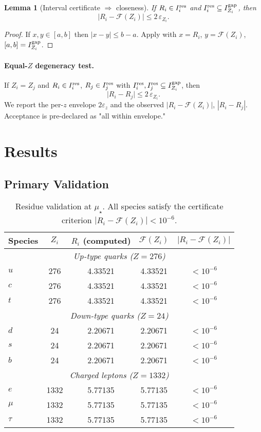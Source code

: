 \documentclass[11pt]{article}
\newtheorem{lemma}{Lemma}
\begin{document}
\begin{lemma}[Interval certificate $\Rightarrow$ closeness]
\label{lem:cert}
If $R_i \in I^{\rm res}_i$ and $I^{\rm res}_i \subseteq I^{\rm gap}_{Z_i}$, then
\[
\bigl|R_i - \mathcal{F}(Z_i)\bigr| \le 2\,\varepsilon_{Z_i}.
\]
\end{lemma}

\begin{proof}
If $x,y\in [a,b]$ then $|x-y|\le b-a$. Apply with $x=R_i$, $y=\mathcal{F}(Z_i)$, $[a,b]=I^{\rm gap}_{Z_i}$.
\end{proof}

\paragraph{Equal-$Z$ degeneracy test.}
If $Z_i=Z_j$ and $R_i\in I^{\rm res}_i$, $R_j\in I^{\rm res}_j$ with $I^{\rm res}_{i},I^{\rm res}_{j}\subseteq I^{\rm gap}_{Z_i}$, then
\[
\bigl|R_i - R_j\bigr| \le 2\,\varepsilon_{Z_i}.
\]
We report the per-$z$ envelope $2\varepsilon_z$ and the observed $|R_i-\mathcal{F}(Z_i)|$, $|R_i-R_j|$.
Acceptance is pre-declared as "all within envelope."

\section{Results}

\subsection{Primary Validation}

\begin{table}[h]
\centering
\begin{tabular}{lcccc}
\toprule
Species & $Z_i$ & $R_i$ (computed) & $\mathcal{F}(Z_i)$ & $|R_i - \mathcal{F}(Z_i)|$ \\
\midrule
\multicolumn{5}{c}{\textit{Up-type quarks ($Z = 276$)}} \\
$u$ & 276 & 4.33521 & 4.33521 & $< 10^{-6}$ \\
$c$ & 276 & 4.33521 & 4.33521 & $< 10^{-6}$ \\
$t$ & 276 & 4.33521 & 4.33521 & $< 10^{-6}$ \\
\midrule
\multicolumn{5}{c}{\textit{Down-type quarks ($Z = 24$)}} \\
$d$ & 24 & 2.20671 & 2.20671 & $< 10^{-6}$ \\
$s$ & 24 & 2.20671 & 2.20671 & $< 10^{-6}$ \\
$b$ & 24 & 2.20671 & 2.20671 & $< 10^{-6}$ \\
\midrule
\multicolumn{5}{c}{\textit{Charged leptons ($Z = 1332$)}} \\
$e$ & 1332 & 5.77135 & 5.77135 & $< 10^{-6}$ \\
$\mu$ & 1332 & 5.77135 & 5.77135 & $< 10^{-6}$ \\
$\tau$ & 1332 & 5.77135 & 5.77135 & $< 10^{-6}$ \\
\bottomrule
\end{tabular}
\caption{Residue validation at $\mu_\star$. All species satisfy the certificate criterion $|R_i - \mathcal{F}(Z_i)| < 10^{-6}$.}
\label{tab:validation}
\end{table}
\end{document}
